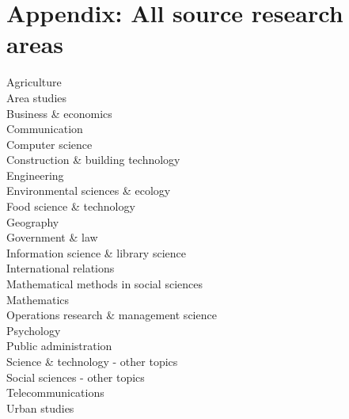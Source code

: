 \documentclass[a4paper]{article}
\begin{document}
\clearpage

\section{Appendix: All source research areas}
\begin{footnotesize}
Agriculture \\ Area studies \\ Business \& economics \\ Communication \\ Computer science \\ Construction \& building technology \\ Engineering \\ Environmental sciences \& ecology \\ Food science \& technology \\ Geography \\ Government \& law \\ Information science \& library science \\ International relations \\ Mathematical methods in social sciences \\ Mathematics \\ Operations research \& management science \\ Psychology \\ Public administration \\ Science \& technology - other topics \\ Social sciences - other topics \\ Telecommunications \\ Urban studies
\end{footnotesize}

\clearpage
\end{document}
